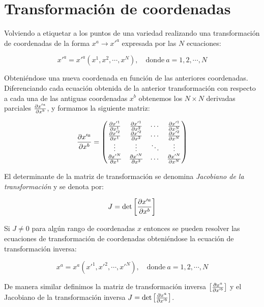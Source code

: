 \documentclass[../main]{subfiles}
\begin{document}
\section{Transformación de coordenadas}

Volviendo a etiquetar a los puntos de una variedad realizando una transformación de coordenadas de la forma $x^a \rightarrow x'^a$ expresada por las $N$ ecuaciones:

\begin{equation}
    x'^a=x'^a(x^1,x^2,\cdots,x^N) , \quad \text{donde} \ a=1,2,\cdots,N
\end{equation}

Obteniéndose una nueva coordenada en función de las anteriores coordenadas. Diferenciando cada ecuación obtenida de la anterior transformación con respecto a cada una de las antiguas coordenadas $x^b$ obtenemos los $N \times N$ derivadas parciales $\pdv{x'^a}{x^b}$, y formamos la siguiente matriz:

\begin{equation}
\pdv{x'^a}{x^b}=
\begin{pmatrix}
\pdv{x'^1}{x^1} & \pdv{x'^1}{x^2} & \cdots & \pdv{x'^1}{x^N} \\
\pdv{x'^2}{x^1} & \pdv{x'^2}{x^2} & \cdots & \pdv{x'^2}{x^N} \\
\vdots & \vdots & \ddots & \vdots \\
\pdv{x'^N}{x^1} & \pdv{x'^N}{x^2} & \cdots & \pdv{x'^N}{x^N}
\end{pmatrix}
\end{equation}

El determinante de la matriz de transformación se denomina \textit{Jacobiano de la transformación} y se denota por:

\begin{equation}
    J=\det \left[ \pdv{x'^a}{x^b}\right]
\end{equation}

Si $J \neq 0$ para algún rango de coordenadas $x$ entonces se pueden resolver las ecuaciones de transformación de coordenadas obteniéndose la ecuación de transformación inversa:

\begin{equation}
    x^a=x^a(x'^1,x'^2,\cdots,x'^N) , \quad \text{donde} \ a=1,2,\cdots,N
\end{equation}

De manera similar definimos la matriz de transformación inversa $\left[ \pdv{x^a}{x'^b}\right]$ y el Jacobiano de la transformación inversa $J=\det \left[ \pdv{x^a}{x'^b}\right]$.
\end{document}
